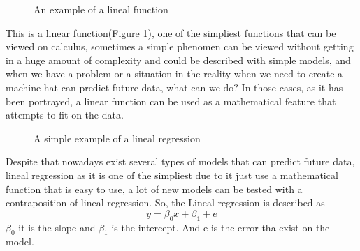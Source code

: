 \documentclass{article}
\begin{document}
\begin{figure}[h]
  \centering
{}
  \caption{An example of a lineal function}
  \label{fig:example2}
\end{figure}


This is a linear function(Figure \ref{fig:example2}),  one of the simpliest functions that can be viewed on calculus, sometimes a simple phenomen can be viewed without getting in a huge amount of complexity and could be described with simple models, and when we have a problem or a situation in the reality when we need to create a machine hat can predict future data, what can we do?
In those cases, as it has been portrayed, a linear function can be used as a mathematical feature that attempts to fit on the data.
\begin{figure}[h]
\centering
{}
  \caption{A simple example of a lineal regression}
  \label{fig:example3}
\end{figure}
Despite that nowadays exist several types of models that can predict future data, lineal regression as it is one of the simpliest due to it just use a mathematical function that is easy to use, a lot of new models can be tested with a contraposition of lineal regression.
So, the Lineal regression is described as 
$$y=\beta_0x+\beta_1+e$$
$\beta_0$ it is the slope and $\beta_1$ is the intercept. And e is the error tha exist on the model.
\end{document}
